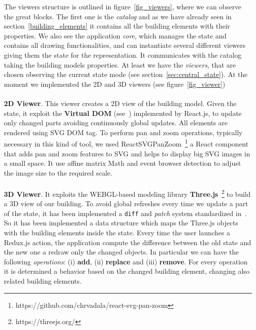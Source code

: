 The viewers structure is outlined in figure~\ref{fig_viewers}, where we can observe the great blocks. The first one is the \textit{catalog} and as we have already seen in section~\ref{building_elements} it contains all the building elements with their properties. We also see the application \textit{core}, which manages the state and contains all drawing functionalities, and can instantiate several different viewers giving them the state for the representation. It communicates with the catalog taking the building models properties. At least we have the \textit{viewers}, that are chosen observing the current state mode (see section~\ref{sec:central_state}). At the moment we implemented the 2D and 3D viewers (see figure~\ref{fig_viewer})\\\\
\textbf{2D Viewer}. This viewer creates a 2D view of the building model. Given the state, it exploit the \textbf{Virtual DOM} (see~\cite{vdom}) implemented by React.js, to update only changed parts avoiding continuously global updates. All elements are rendered using SVG DOM tag. To perform pan and zoom operations, typically necessary in this kind of tool, we used ReactSVGPanZoom~\footnote{https://github.com/chrvadala/react-svg-pan-zoom} a React component that adds pan and zoom features to SVG and helps to display big SVG images in a small space. It use affine matrix Math and event browser detection to adjust the image size to the required scale.\\\\

\textbf{3D Viewer}. It exploits the WEBGL-based modeling library \textbf{Three.js}~\footnote{https://threejs.org/} to build a 3D view of our building. To avoid global refreshes every time we update a part of the state, it has been implemented a \texttt{diff} and \textit{patch} system standardized in~\cite{rfc6902}. So it has been implemented a data structure which maps the Three.js objects with the building elements inside the state. Every time the user launches a Redux.js action, the application compute the difference between the old state and the new one a redraw only the changed objects. In particular we can have the following \textit{operations}: (i) \textbf{add}, (ii) \textbf{replace} and (iii) \textbf{remove}. For every operation it is determined a behavior based on the changed building element, changing also related building elements.

